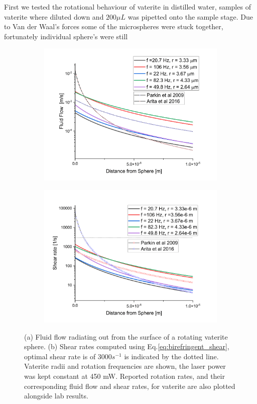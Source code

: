 First we tested the rotational behaviour of vaterite in distilled water, 
samples of vaterite where diluted down and $200\mu L$ was pipetted onto
the sample stage. Due to Van der Waal's forces some of the microspheres 
were stuck together, fortunately individual sphere's were still

\begin{figure}[h!]
	\label{fig:vaterite_shear}
	\begin{subfigure}{0.5\linewidth}
		\includegraphics[width=\linewidth]{vaterite_fluid_flow.png}
		\subcaption{}
	\end{subfigure}
	\begin{subfigure}{0.5\linewidth}
		\includegraphics[width=\linewidth]{vaterite_shear_rate.png}
		\subcaption{}
	\end{subfigure}
	\caption{(a) Fluid flow radiating out from the surface of a rotating vaterite sphere. (b) Shear rates computed using Eq.\ref{eq:birefringent_shear}, optimal shear rate is of $3000 s^{-1}$ is indicated by the dotted line. Vaterite radii and rotation frequencies are shown, the laser power was kept constant at 450 mW. Reported rotation rates, and their corresponding fluid flow and shear rates, for vaterite are also plotted alongside lab results.}
\end{figure}

